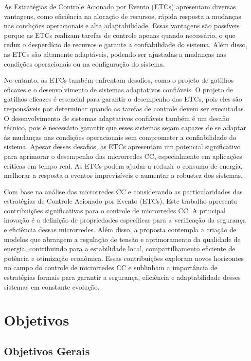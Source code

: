 As Estratégias de Controle Acionado por Evento (ETCs) apresentam diversas vantagens, como eficiência na alocação de recursos, rápida resposta a mudanças nas condições operacionais e alta adaptabilidade. Essas vantagens são possíveis porque as ETCs realizam tarefas de controle apenas quando necessário, o que reduz o desperdício de recursos e garante a confiabilidade do sistema. Além disso, as ETCs são altamente adaptáveis, podendo ser ajustadas a mudanças nas condições operacionais ou na configuração do sistema.

No entanto, as ETCs também enfrentam desafios, como o projeto de gatilhos eficazes e o desenvolvimento de sistemas adaptativos confiáveis. O projeto de gatilhos eficazes é essencial para garantir o desempenho das ETCs, pois eles são responsáveis por determinar quando as tarefas de controle devem ser executadas. O desenvolvimento de sistemas adaptativos confiáveis também é um desafio técnico, pois é necessário garantir que esses sistemas sejam capazes de se adaptar às mudanças nas condições operacionais sem comprometer a confiabilidade do sistema. Apesar desses desafios, as ETCs apresentam um potencial significativo para aprimorar o desempenho das microrredes CC, especialmente em aplicações críticas em tempo real. As ETCs podem ajudar a reduzir o consumo de energia, melhorar a resposta a eventos imprevisíveis e aumentar a robustez dos sistemas.

Com base na análise das microrredes CC e considerando as particularidades das estratégias de Controle Acionado por Evento (ETCs), Este trabalho apresenta contribuições significativas para o controle de microrredes CC. A principal inovação é a definição de propriedades específicas para a verificação da segurança e eficiência dessas microrredes. Além disso, a proposta contempla a criação de modelos que abrangem a regulação de tensão e aprimoramento da qualidade de energia, contribuindo para a estabilidade local, compartilhamento eficiente de potência e otimização econômica. Essas contribuições exploram novos horizontes no campo do controle de microrredes CC e sublinham a importância de estratégias formais para garantir a segurança, eficiência e adaptabilidade desses sistemas em constante evolução.

\section{Objetivos}

\subsection{Objetivos Gerais}

